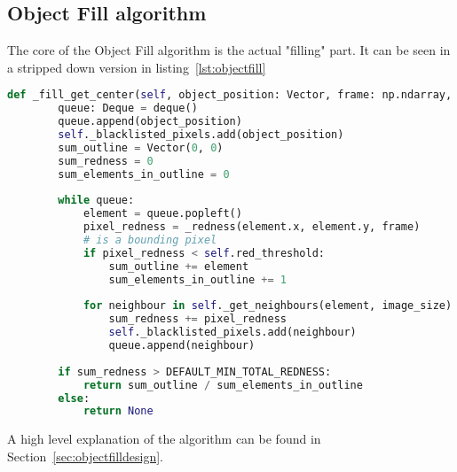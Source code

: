 \subsection{Object Fill algorithm}\label{solution:objfillalgo}

The core of the Object Fill algorithm is the actual "filling" part.
It can be seen in a stripped down version in listing~\ref{lst:objectfill}

\begin{lstlisting}[language=Python,label={lst:objectfill},caption={Stripped version of thresh moment from thresh\_moment.py}]
    def _fill_get_center(self, object_position: Vector, frame: np.ndarray, image_size: Vector) -> Optional[Vector]:
	    queue: Deque = deque()
	    queue.append(object_position)
	    self._blacklisted_pixels.add(object_position)
	    sum_outline = Vector(0, 0)
	    sum_redness = 0
	    sum_elements_in_outline = 0
	    
	    while queue:
		    element = queue.popleft()
		    pixel_redness = _redness(element.x, element.y, frame)
		    # is a bounding pixel
		    if pixel_redness < self.red_threshold:
			    sum_outline += element
			    sum_elements_in_outline += 1
		    
		    for neighbour in self._get_neighbours(element, image_size) - self._blacklisted_pixels:
			    sum_redness += pixel_redness
			    self._blacklisted_pixels.add(neighbour)
			    queue.append(neighbour)
	    
	    if sum_redness > DEFAULT_MIN_TOTAL_REDNESS:
		    return sum_outline / sum_elements_in_outline
	    else:
		    return None
\end{lstlisting}

A high level explanation of the algorithm can be found in Section~\ref{sec:objectfilldesign}.